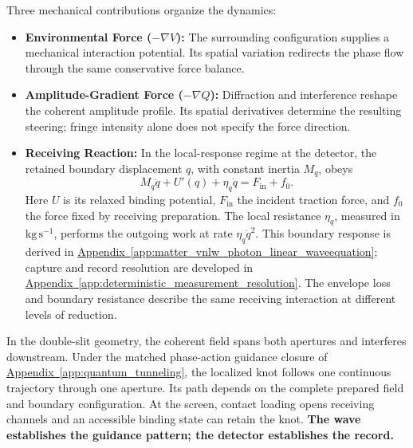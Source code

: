 Three mechanical contributions organize the dynamics:
\begin{itemize}
    \item \textbf{Environmental Force ($-\nabla V$):}
    The surrounding configuration supplies a mechanical interaction potential. Its spatial variation redirects the phase flow through the same conservative force balance.

    \item \textbf{Amplitude-Gradient Force ($-\nabla Q$):}
    Diffraction and interference reshape the coherent amplitude profile. Its spatial derivatives determine the resulting steering; fringe intensity alone does not specify the force direction.

    \item \textbf{Receiving Reaction:}
    In the local-response regime at the detector, the retained boundary displacement $q$, with constant inertia $M_q$, obeys
    \begin{equation}
        M_q\ddot q+U'(q)+\eta_q\dot q
        =
        F_{\mathrm{in}}+f_0.
    \end{equation}
    Here $U$ is its relaxed binding potential, $F_{\mathrm{in}}$ the incident traction force, and $f_0$ the force fixed by receiving preparation. The local resistance $\eta_q$, measured in $\mathrm{kg\,s^{-1}}$, performs the outgoing work at rate $\eta_q\dot q^2$. This boundary response is derived in \hyperref[app:matter_vnlw_photon_linear_waveequation]{Appendix~\ref*{app:matter_vnlw_photon_linear_waveequation}}; capture and record resolution are developed in \hyperref[app:deterministic_measurement_resolution]{Appendix~\ref*{app:deterministic_measurement_resolution}}. The envelope loss and boundary resistance describe the same receiving interaction at different levels of reduction.
\end{itemize}

In the double-slit geometry, the coherent field spans both apertures and interferes downstream. Under the matched phase-action guidance closure of \hyperref[app:quantum_tunneling]{Appendix~\ref*{app:quantum_tunneling}}, the localized knot follows one continuous trajectory through one aperture. Its path depends on the complete prepared field and boundary configuration. At the screen, contact loading opens receiving channels and an accessible binding state can retain the knot. \textbf{The wave establishes the guidance pattern; the detector establishes the record.}

